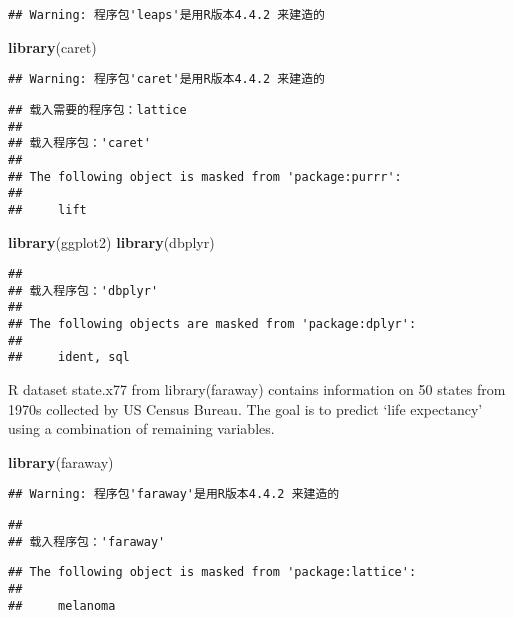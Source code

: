 \documentclass[
]{article}
\newenvironment{Shaded}{\begin{snugshade}}{\end{snugshade}}
\newcommand{\FunctionTok}[1]{\textcolor[rgb]{0.13,0.29,0.53}{\textbf{#1}}}
\newcommand{\NormalTok}[1]{#1}
\begin{document}
\begin{verbatim}
## Warning: 程序包'leaps'是用R版本4.4.2 来建造的
\end{verbatim}

\begin{Shaded}
\begin{Highlighting}[]
\FunctionTok{library}\NormalTok{(caret)}
\end{Highlighting}
\end{Shaded}

\begin{verbatim}
## Warning: 程序包'caret'是用R版本4.4.2 来建造的
\end{verbatim}

\begin{verbatim}
## 载入需要的程序包：lattice
## 
## 载入程序包：'caret'
## 
## The following object is masked from 'package:purrr':
## 
##     lift
\end{verbatim}

\begin{Shaded}
\begin{Highlighting}[]
\FunctionTok{library}\NormalTok{(ggplot2)}
\FunctionTok{library}\NormalTok{(dbplyr)}
\end{Highlighting}
\end{Shaded}

\begin{verbatim}
## 
## 载入程序包：'dbplyr'
## 
## The following objects are masked from 'package:dplyr':
## 
##     ident, sql
\end{verbatim}

R dataset state.x77 from library(faraway) contains information on 50
states from 1970s collected by US Census Bureau. The goal is to predict
`life expectancy' using a combination of remaining variables.

\begin{Shaded}
\begin{Highlighting}[]
\FunctionTok{library}\NormalTok{(faraway)}
\end{Highlighting}
\end{Shaded}

\begin{verbatim}
## Warning: 程序包'faraway'是用R版本4.4.2 来建造的
\end{verbatim}

\begin{verbatim}
## 
## 载入程序包：'faraway'
\end{verbatim}

\begin{verbatim}
## The following object is masked from 'package:lattice':
## 
##     melanoma
\end{verbatim}
\end{document}
